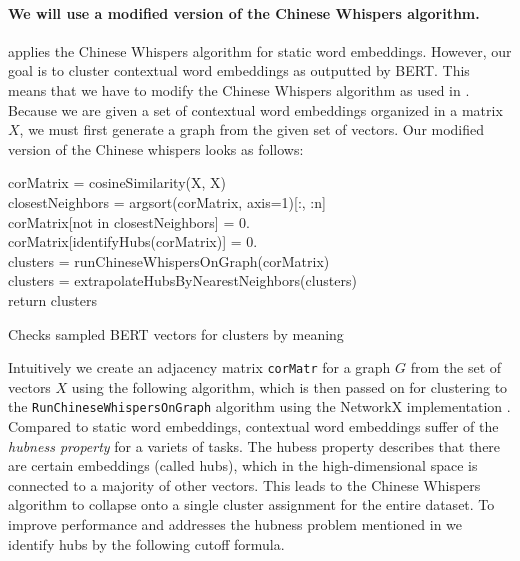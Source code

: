 \documentclass[a4paper,12pt,oneside,openright]{report}
\begin{document}

\paragraph{We will use a modified version of the Chinese Whispers algorithm.}
\cite{pelevina16} applies the Chinese Whispers algorithm for static word embeddings.
However, our goal is to cluster contextual word embeddings as outputted by BERT.
This means that we have to modify the Chinese Whispers algorithm as used in \cite{pelevina16}.
Because we are given a set of contextual word embeddings organized in a matrix $X$, we must first generate a graph from the given set of vectors.
Our modified version of the Chinese whispers looks as follows: \\

\begin{algorithm}[H]
\SetAlgoLined
{}

corMatrix = cosineSimilarity(X, X) \\
closestNeighbors = argsort(corMatrix, axis=1)[:, :n] \\
corMatrix[not in closestNeighbors] = 0. \\

corMatrix[identifyHubs(corMatrix)] = 0. \\

clusters = runChineseWhispersOnGraph(corMatrix) \\

clusters = extrapolateHubsByNearestNeighbors(clusters) \\

return clusters

 \caption{Checks sampled BERT vectors for clusters by  meaning}
\end{algorithm}

\hfill \break

Intuitively we create an adjacency matrix \texttt{corMatr} for a graph $G$ from the set of vectors $X$ using the following algorithm, which is then passed on for clustering to the \texttt{RunChineseWhispersOnGraph} algorithm using the NetworkX implementation \cite{hagberg04}.
Compared to static word embeddings, contextual word embeddings suffer of the \textit{hubness property} \cite{conneau17} for a variets of tasks.
The hubess property describes that there are certain embeddings (called hubs), which in the high-dimensional space is connected to a majority of other vectors.
This leads to the Chinese Whispers algorithm to collapse onto a single cluster assignment for the entire dataset.
To improve performance and addresses the hubness problem mentioned in \cite{conneau17} we identify hubs by the following cutoff formula.
\end{document}
